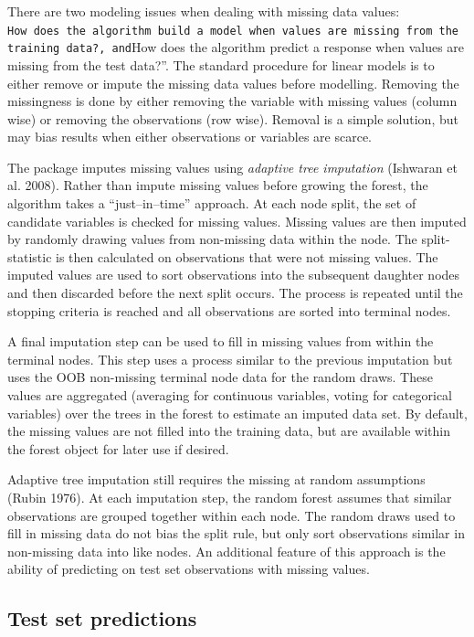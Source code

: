 \documentclass[article]{jss}
\begin{document}
There are two modeling issues when dealing with missing data values:
\texttt{How\ does\ the\ algorithm\ build\ a\ model\ when\ values\ are\ missing\ from\ the\ training\ data?\textquotesingle{}\textquotesingle{},\ and}How
does the algorithm predict a response when values are missing from the
test data?''. The standard procedure for linear models is to either
remove or impute the missing data values before modelling. Removing the
missingness is done by either removing the variable with missing values
(column wise) or removing the observations (row wise). Removal is a
simple solution, but may bias results when either observations or
variables are scarce.

The  package imputes missing values using
\emph{adaptive tree imputation} (Ishwaran et al. 2008). Rather than
impute missing values before growing the forest, the algorithm takes a
``just--in--time'' approach. At each node split, the set of 
candidate variables is checked for missing values. Missing values are
then imputed by randomly drawing values from non-missing data within the
node. The split-statistic is then calculated on observations that were
not missing values. The imputed values are used to sort observations
into the subsequent daughter nodes and then discarded before the next
split occurs. The process is repeated until the stopping criteria is
reached and all observations are sorted into terminal nodes.

A final imputation step can be used to fill in missing values from
within the terminal nodes. This step uses a process similar to the
previous imputation but uses the OOB non-missing terminal node data for
the random draws. These values are aggregated (averaging for continuous
variables, voting for categorical variables) over the  trees
in the forest to estimate an imputed data set. By default, the missing
values are not filled into the training data, but are available within
the forest object for later use if desired.

Adaptive tree imputation still requires the missing at random
assumptions (Rubin 1976). At each imputation step, the random forest
assumes that similar observations are grouped together within each node.
The random draws used to fill in missing data do not bias the split
rule, but only sort observations similar in non-missing data into like
nodes. An additional feature of this approach is the ability of
predicting on test set observations with missing values.

\subsection{Test set predictions}\label{test-set-predictions}
\end{document}
